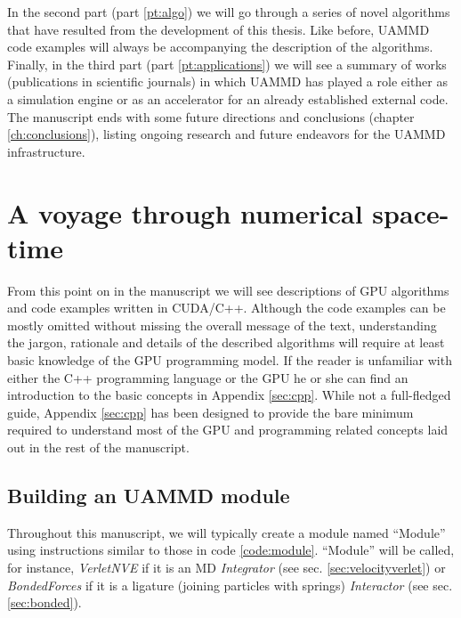 \documentclass[twoside,openright,titlepage,numbers=noenddot,%
headinclude,footinclude,cleardoublepage=empty,abstract=on,
BCOR=5mm,fontsize=11pt, dvipsnames, paper=b5
]{scrreprt}
\newcommand{\uammd}{\gls{UAMMD}\xspace}
\begin{document}
 In the second part (part \ref{pt:algo}) we will go through a series of novel algorithms that have resulted from the development of this thesis. Like before, \uammd code examples will always be accompanying the description of the algorithms. Finally, in the third part (part \ref{pt:applications}) we will see a summary of works (publications in scientific journals) in which \uammd has played a role either as a simulation engine or as an accelerator for an already established external code. The manuscript ends with some future directions and conclusions (chapter \ref{ch:conclusions}), listing ongoing research and future endeavors for the \uammd infrastructure.



\cleardoublepage
 
\newpage

\cleardoublepage

\part{A voyage through numerical space-time}\label{part:voyage}


From this point on in the manuscript we will see descriptions of GPU algorithms and code examples written in CUDA/C++. Although the code examples can be mostly omitted without missing the overall message of the text, understanding the jargon, rationale and details of the described algorithms will require at least basic knowledge of the GPU programming model. If the reader is unfamiliar with either the C++ programming language or the GPU he or she can find an introduction to the basic concepts in Appendix \ref{sec:cpp}. While not a full-fledged guide, Appendix \ref{sec:cpp} has been designed to provide the bare minimum required to understand most of the GPU and programming related concepts laid out in the rest of the manuscript.

\chapter{Building an UAMMD module}

Throughout this manuscript, we will typically create a module named ``Module'' using instructions similar to those in code \ref{code:module}. ``Module'' will be called, for instance, \emph{VerletNVE} if it is an \gls{MD} \emph{Integrator} (see sec. \ref{sec:velocityverlet}) or \emph{BondedForces} if it is a ligature (joining particles with springs) \emph{Interactor} (see sec. \ref{sec:bonded}).
\end{document}
